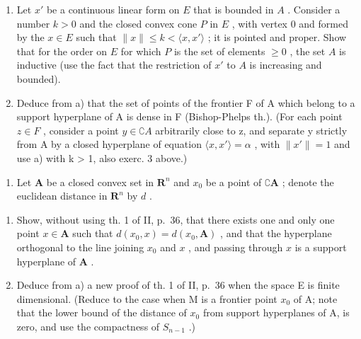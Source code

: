 \begin{enumerate}
\def\labelenumi{\alph{enumi})}
\item
  Let \(x'\) be a continuous linear form on \(E\) that is bounded in \(A\) . Consider a number \(k > 0\) and the closed convex cone \(P\) in \(E\) , with vertex 0 and formed by the \(x \in E\) such that \(\| x \| \leqslant k < \langle x, x' \rangle\) ; it is pointed and proper. Show that for the order on \(E\) for which \(P\) is the set of elements \(\geqslant 0\) , the set \(A\) is inductive (use the fact that the restriction of \(x'\) to \(A\) is increasing and bounded).
\item
  Deduce from a) that the set of points of the frontier F of A which belong to a support hyperplane of A is dense in F (Bishop-Phelps th.). (For each point \(z \in F\) , consider a point \(y \in \complement A\) arbitrarily close to z, and separate y strictly from A by a closed hyperplane of equation \(\langle x, x' \rangle = \alpha\) , with \(\|x' \| = 1\) and use a) with k > 1, also exerc. 3 above.)
\end{enumerate}

\begin{enumerate}
\def\labelenumi{\arabic{enumi})}
\setcounter{enumi}{4}
\tightlist
\item
  Let \(\mathbf{A}\) be a closed convex set in \(\mathbf{R}^n\) and \(x_0\) be a point of \(\complement \mathbf{A}\) ; denote the euclidean distance in \(\mathbf{R}^n\) by \(d\) .
\end{enumerate}

\begin{enumerate}
\def\labelenumi{\alph{enumi})}
\item
  Show, without using th. 1 of II, p.~36, that there exists one and only one point \(x \in \mathbf{A}\) such that \(d(x_0, x) = d(x_0, \mathbf{A})\) , and that the hyperplane orthogonal to the line joining \(x_0\) and \(x\) , and passing through \(x\) is a support hyperplane of \(\mathbf{A}\) .
\item
  Deduce from a) a new proof of th. 1 of II, p.~36 when the space E is finite dimensional. (Reduce to the case when M is a frontier point \(x_{0}\) of A; note that the lower bound of the distance of \(x_{0}\) from support hyperplanes of A, is zero, and use the compactness of \(S_{n-1}\) .)
\end{enumerate}

